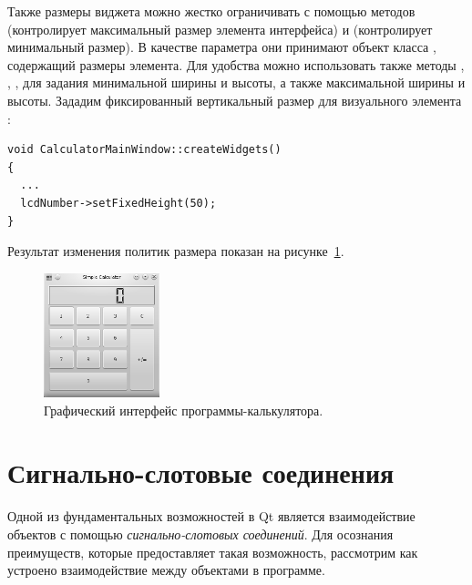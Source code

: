 Также размеры виджета можно жестко ограничивать с помощью методов
 (контролирует максимальный размер элемента интерфейса) и 
(контролирует минимальный размер). В качестве параметра они принимают объект класса ,
содержащий размеры элемента. Для удобства можно использовать также методы ,
, ,  для задания минимальной ширины и
высоты, а также максимальной ширины и высоты. Зададим фиксированный вертикальный размер для визуального элемента
:
\begin{lstlisting}
void CalculatorMainWindow::createWidgets()
{
  ...
  lcdNumber->setFixedHeight(50);
}
\end{lstlisting}

Результат изменения политик размера показан на рисунке~\ref{ch13:refDrawing5}.
\begin{figure}[htb]
\begin{center}
\includegraphics[width=0.3\textwidth]{img/ris_13_6}
\caption{Графический интерфейс программы-калькулятора.}
\label{ch13:refDrawing5}
\end{center}
\end{figure}

\section[Сигнально-слотовые соединения]{Сигнально-слотовые соединения}
Одной из фундаментальных возможностей в Qt является взаимодействие объектов с помощью \emph{сигнально-слотовых
соединений}. Для осознания преимуществ, которые предоставляет такая  возможность, рассмотрим как устроено
взаимодействие между объектами в программе.

